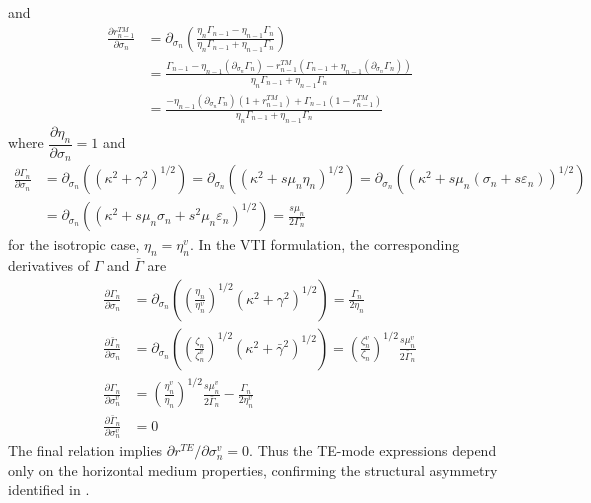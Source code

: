 \documentclass[12pt]{report}
\newcommand{\pds}[1]{\partial_{\sigma_{#1}}}   %
\begin{document}
and
\begin{align}
    \frac{\partial r_{n-1}^{TM}}{\partial \sigma_n}
    &= \pds{n}\!\left(\frac{\eta_n\Gamma_{n-1} - \eta_{n-1}\Gamma_n}
                          {\eta_n\Gamma_{n-1} + \eta_{n-1}\Gamma_n}\right) \nonumber \\
    &= \frac{\Gamma_{n-1} - \eta_{n-1}(\pds{n}\Gamma_n)
             - r_{n-1}^{TM}\!\left(\Gamma_{n-1} + \eta_{n-1}(\pds{n}\Gamma_n)\right)}
            {\eta_n\Gamma_{n-1} + \eta_{n-1}\Gamma_n} \nonumber \\
    &= \frac{-\eta_{n-1}(\pds{n}\Gamma_n)(1 + r_{n-1}^{TM}) + \Gamma_{n-1}(1 - r_{n-1}^{TM})}
            {\eta_n\Gamma_{n-1} + \eta_{n-1}\Gamma_n}
    \label{eq:1.16}
\end{align}
where \(\dfrac{\partial \eta_n}{\partial \sigma_n} = 1\) and
\begin{align}
    \frac{\partial \Gamma_n}{\partial \sigma_n}
    &= \pds{n}\!\left((\kappa^2 + \gamma^2)^{1/2}\right)
     = \pds{n}\!\left((\kappa^2 + s\mu_n\eta_n)^{1/2}\right)
     = \pds{n}\!\left((\kappa^2 + s\mu_n(\sigma_n + s\varepsilon_n))^{1/2}\right) \nonumber \\
    &= \pds{n}\!\left((\kappa^2 + s\mu_n\sigma_n + s^2\mu_n\varepsilon_n)^{1/2}\right)
     = \frac{s\mu_n}{2\Gamma_n}
    \label{eq:1.17}
\end{align}
for the isotropic case, \(\eta_n=\eta_n^v\). In the VTI formulation,
the corresponding derivatives of \(\Gamma\) and \(\bar\Gamma\) are
\begin{align}
    \frac{\partial \Gamma_n}{\partial \sigma_n}
    &= \pds{n}\!\left(\left(\frac{\eta_n}{\eta^v_n}\right)^{1/2}(\kappa^2 + \gamma^2)^{1/2}\right)
     = \frac{\Gamma_n}{2\eta_n}
    \label{eq:1.18} \\
    \frac{\partial \bar{\Gamma}_n}{\partial \sigma_n}
    &= \pds{n}\!\left(\left(\frac{\zeta_n}{\zeta^v_n}\right)^{1/2}(\kappa^2 + \bar{\gamma}^2)^{1/2}\right)
     = \left(\frac{\zeta^v_n}{\zeta_n}\right)^{1/2}\frac{s\mu^v_n}{2\bar{\Gamma}_n}
    \label{eq:1.19} \\
    \frac{\partial \Gamma_n}{\partial \sigma^v_n}
    &= \left(\frac{\eta^v_n}{\eta_n}\right)^{1/2}\frac{s\mu^v_n}{2\bar{\Gamma}_n}
       - \frac{\Gamma_n}{2\eta^v_n}
    \label{eq:1.20} \\
    \frac{\partial \bar{\Gamma}_n}{\partial \sigma^v_n}
    &= 0
    \label{eq:1.21}
\end{align}
The final relation implies
\(\partial r^{TE}/\partial\sigma_n^v=0\). Thus the TE-mode expressions
depend only on the horizontal medium properties, confirming the structural
asymmetry identified in .
\end{document}
